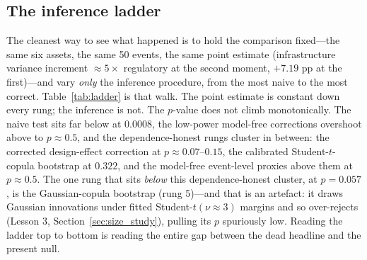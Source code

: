 \documentclass[pdflatex,sn-mathphys-num]{sn-jnl}
\theoremstyle{thmstyleone}
\theoremstyle{thmstyletwo}
\theoremstyle{thmstylethree}
\begin{document}
\subsection{The inference ladder}\label{sec:ladder}

The cleanest way to see what happened is to hold the comparison fixed---the same six assets, the same 50 events, the same point estimate (infrastructure variance increment $\approx 5\times$ regulatory at the second moment, $+7.19$ pp at the first)---and vary \emph{only} the inference procedure, from the most naive to the most correct. Table~\ref{tab:ladder} is that walk. The point estimate is constant down every rung; the inference is not. The $p$-value does not climb monotonically. The naive test sits far below at $0.0008$, the low-power model-free corrections overshoot above to $p\approx 0.5$, and the dependence-honest rungs cluster in between: the corrected design-effect correction at $p\approx 0.07$--$0.15$, the calibrated Student-$t$-copula bootstrap at $0.322$, and the model-free event-level proxies above them at $p\approx 0.5$. The one rung that sits \emph{below} this dependence-honest cluster, at $p=0.057$, is the Gaussian-copula bootstrap (rung 5)---and that is an artefact: it draws Gaussian innovations under fitted Student-$t(\nu\approx 3)$ margins and so over-rejects (Lesson 3, Section~\ref{sec:size_study}), pulling its $p$ spuriously low. Reading the ladder top to bottom is reading the entire gap between the dead headline and the present null.
\end{document}
